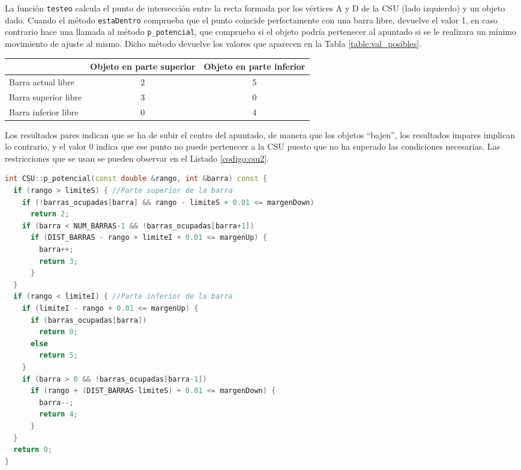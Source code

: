 La función \texttt{testeo} calcula el punto de intersección entre la recta
formada por los vértices A y D de la CSU (lado izquierdo) y un objeto dado.
Cuando el método \texttt{estaDentro} comprueba que el punto coincide
perfectamente con una barra libre, devuelve el valor 1, en caso contrario hace
una llamada al método \texttt{p\_potencial}, que comprueba si el objeto podría
pertenecer al apuntado si se le realizara un mínimo movimiento de ajuste al
mismo. Dicho método devuelve los valores que aparecen en la Tabla
\ref{table:val_posibles}.

\begin{table*}[!ht]
\centering
\begin{tabular}{||l||c|c||}
\hline
\hline
 & Objeto en parte superior & Objeto en parte inferior \\
\hline
\hline
Barra actual libre &  2 & 5 \\
\hline
Barra superior libre & 3 & 0 \\
\hline
Barra inferior libre & 0 & 4 \\
\hline
\hline
\end{tabular}
\caption{Posibles valores del método \texttt{p\_potencial}}
\label{table:val_posibles}
\end{table*}

Los resultados pares indican que se ha de subir el centro del apuntado, de
manera que los objetos ``bajen'', los resultados impares implican lo contrario,
y el valor 0 indica que ese punto no puede pertenecer a la CSU puesto que no ha
superado las condiciones necesarias. Las restricciones que se usan se pueden observar
en el Listado \ref{codigo:csu2}.

\begin{lstlisting}[float=tpb,
                   language=C++,basicstyle=\ttfamily\footnotesize, 
                   caption={Función que comprueba si un objeto podría estár en la CSU},
                   label={codigo:csu2}]
int CSU::p_potencial(const double &rango, int &barra) const {
  if (rango > limiteS) { //Parte superior de la barra
    if (!barras_ocupadas[barra] && rango - limiteS + 0.01 <= margenDown)
      return 2;
    if (barra < NUM_BARRAS-1 && !barras_ocupadas[barra+1])
      if (DIST_BARRAS - rango + limiteI + 0.01 <= margenUp) {
        barra++;
        return 3;
      }
  }
  if (rango < limiteI) { //Parte inferior de la barra
    if (limiteI - rango + 0.01 <= margenUp) {
      if (barras_ocupadas[barra])
        return 0;
      else
        return 5;
    }
    if (barra > 0 && !barras_ocupadas[barra-1])
      if (rango + (DIST_BARRAS-limiteS) + 0.01 <= margenDown) {
        barra--;
        return 4;
      }
  }
  return 0;
}
\end{lstlisting}

